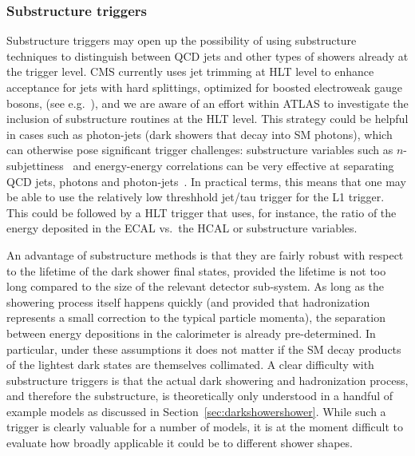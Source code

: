 \begin{enumerate}
\subsubsection{Substructure triggers}
Substructure triggers may open up the possibility of using substructure techniques to distinguish between QCD jets and other types of showers already at the trigger level.
CMS currently uses jet trimming at HLT level to enhance acceptance for jets with hard splittings, optimized for boosted electroweak gauge bosons, (see e.g.~\cite{Sirunyan:2017wto,Sirunyan:2017acf}), and we are aware of an effort within ATLAS to investigate the inclusion of substructure routines at the HLT level.   This strategy could be helpful in cases such as photon-jets (dark showers that decay into SM photons), which can otherwise pose significant trigger challenges: substructure variables such as $n$-subjettiness~\cite{Thaler:2010tr} and energy-energy correlations can be very effective at separating QCD jets, photons and photon-jets~\cite{Ellis:2012sd,Ellis:2012zp}. In practical terms, this means that one may be able to use the relatively low threshhold jet/tau trigger for the L1 trigger.  This could be followed by a HLT trigger that uses, for instance, the ratio of the energy deposited in the ECAL vs.~the HCAL or substructure variables.

An advantage of  substructure methods is that they are fairly robust with respect to the lifetime of the dark shower final states, provided the lifetime is not too long compared to the size of the relevant detector sub-system. As long as the showering process itself happens quickly (and provided that hadronization represents a small correction to the typical particle momenta), %
the separation between energy depositions in the calorimeter is already pre-determined.  In particular, under these assumptions it does not matter if the SM decay products of the lightest dark states are themselves collimated. %
A clear difficulty with substructure triggers is that the actual dark showering and hadronization process, and therefore the substructure, is theoretically only understood in a handful of example models as discussed in Section~\ref{sec:darkshowershower}. While such a trigger is clearly valuable for a number of models, it is at the moment difficult to evaluate how broadly applicable it could be to different shower shapes.


\end{enumerate}
